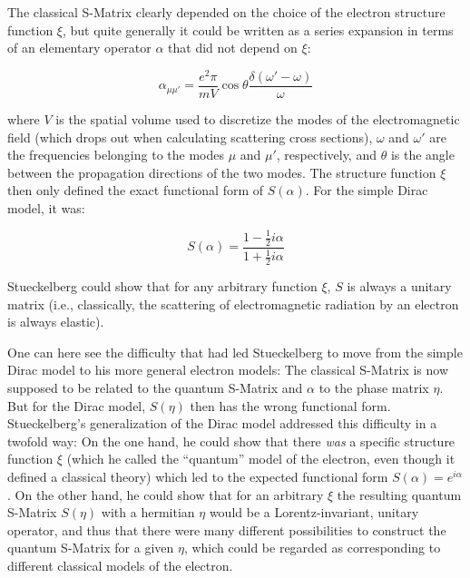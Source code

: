 \documentclass[12pt]{article}
\begin{document}
The classical S-Matrix clearly depended on the choice of the electron structure function $\xi$, but quite generally it could be written as a series expansion in terms of an elementary operator $\alpha$ that did not depend on $\xi$:

\begin{equation}
\alpha_{\mu \mu'} = \frac{e^2 \pi}{m V}  \cos{\theta} \frac{\delta(\omega'-\omega)}{\omega}
\end{equation}

where $V$ is the spatial volume used to discretize the modes of the electromagnetic field (which drops out when calculating scattering cross sections), $\omega$ and $\omega'$ are the frequencies belonging to the modes $\mu$ and $\mu'$, respectively, and $\theta$ is the angle between the propagation directions of the two modes. The structure function $\xi$ then only defined the exact functional form of $S(\alpha)$. For the simple Dirac model, it was:

\begin{equation}
\label{eq:heitler}
S(\alpha) = \frac{1- \frac{1}{2} i \alpha}{1+ \frac{1}{2} i \alpha}
\end{equation}

Stueckelberg could show that for any arbitrary function $\xi$, $S$ is always a unitary matrix (i.e., classically, the scattering of electromagnetic radiation by an electron is always elastic).

One can here see the difficulty that had led Stueckelberg to move from the simple Dirac model to his more general electron models: The classical S-Matrix is now supposed to be related to the quantum S-Matrix and $\alpha$ to the phase matrix $\eta$. But for the Dirac model, $S(\eta)$ then has the wrong functional form. Stueckelberg's generalization of the Dirac model addressed this difficulty in a twofold way: On the one hand, he could show that there \emph{was} a specific structure function $\xi$ (which he called the ``quantum'' model of the electron, even though it defined a classical theory) which led to the expected functional form $S(\alpha) = e^{i \alpha}$. On the other hand, he could show that for an arbitrary $\xi$ the resulting quantum S-Matrix $S(\eta)$ with a hermitian $\eta$ would be a Lorentz-invariant, unitary operator, and thus that there were many different possibilities to construct the quantum S-Matrix for a given $\eta$, which could be regarded as corresponding to different classical models of the electron.
\end{document}
